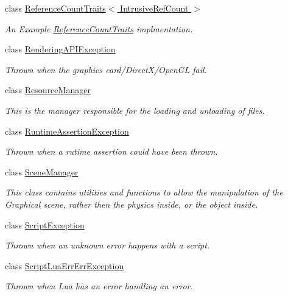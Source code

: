 \begin{DoxyCompactItemize}
class \hyperlink{classMezzanine_1_1ReferenceCountTraits_3_01IntrusiveRefCount_01_4}{Reference\-Count\-Traits$<$ Intrusive\-Ref\-Count $>$}
\begin{DoxyCompactList}\small\item\em An Example \hyperlink{classMezzanine_1_1ReferenceCountTraits}{Reference\-Count\-Traits} implmentation. \end{DoxyCompactList}\item 
class \hyperlink{classMezzanine_1_1RenderingAPIException}{Rendering\-A\-P\-I\-Exception}
\begin{DoxyCompactList}\small\item\em Thrown when the graphics card/\-Direct\-X/\-Open\-G\-L fail. \end{DoxyCompactList}\item 
class \hyperlink{classMezzanine_1_1ResourceManager}{Resource\-Manager}
\begin{DoxyCompactList}\small\item\em This is the manager responsible for the loading and unloading of files. \end{DoxyCompactList}\item 
class \hyperlink{classMezzanine_1_1RuntimeAssertionException}{Runtime\-Assertion\-Exception}
\begin{DoxyCompactList}\small\item\em Thrown when a rutime assertion could have been thrown. \end{DoxyCompactList}\item 
class \hyperlink{classMezzanine_1_1SceneManager}{Scene\-Manager}
\begin{DoxyCompactList}\small\item\em This class contains utilities and functions to allow the manipulation of the Graphical scene, rather then the physics inside, or the object inside. \end{DoxyCompactList}\item 
class \hyperlink{classMezzanine_1_1ScriptException}{Script\-Exception}
\begin{DoxyCompactList}\small\item\em Thrown when an unknown error happens with a script. \end{DoxyCompactList}\item 
class \hyperlink{classMezzanine_1_1ScriptLuaErrErrException}{Script\-Lua\-Err\-Err\-Exception}
\begin{DoxyCompactList}\small\item\em Thrown when Lua has an error handling an error. \end{DoxyCompactList}\item 

\end{DoxyCompactItemize}
